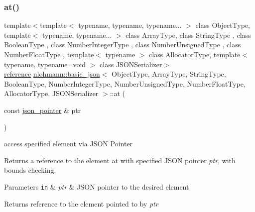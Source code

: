\subsubsection{\texorpdfstring{at()}{at()}\hspace{0.1cm}{\footnotesize\ttfamily [5/6]}}
{\footnotesize\ttfamily template$<$template$<$ typename, typename, typename... $>$ class Object\+Type, template$<$ typename, typename... $>$ class Array\+Type, class String\+Type , class Boolean\+Type , class Number\+Integer\+Type , class Number\+Unsigned\+Type , class Number\+Float\+Type , template$<$ typename $>$ class Allocator\+Type, template$<$ typename, typename=void $>$ class J\+S\+O\+N\+Serializer$>$ \\
\hyperlink{classnlohmann_1_1basic__json_ac6a5eddd156c776ac75ff54cfe54a5bc}{reference} \hyperlink{classnlohmann_1_1basic__json}{nlohmann\+::basic\+\_\+json}$<$ Object\+Type, Array\+Type, String\+Type, Boolean\+Type, Number\+Integer\+Type, Number\+Unsigned\+Type, Number\+Float\+Type, Allocator\+Type, J\+S\+O\+N\+Serializer $>$\+::at (\begin{DoxyParamCaption}\item[{const \hyperlink{classnlohmann_1_1basic__json_a6886a5001f5b449ad316101a311ce536}{json\+\_\+pointer} \&}]{ptr }\end{DoxyParamCaption})\hspace{0.3cm}{\ttfamily [inline]}}



access specified element via J\+S\+ON Pointer 

Returns a reference to the element at with specified J\+S\+ON pointer {\itshape ptr}, with bounds checking.


\begin{DoxyParams}[1]{Parameters}
\mbox{\tt in}  & {\em ptr} & J\+S\+ON pointer to the desired element\\
\hline
\end{DoxyParams}
\begin{DoxyReturn}{Returns}
reference to the element pointed to by {\itshape ptr} 
\end{DoxyReturn}

